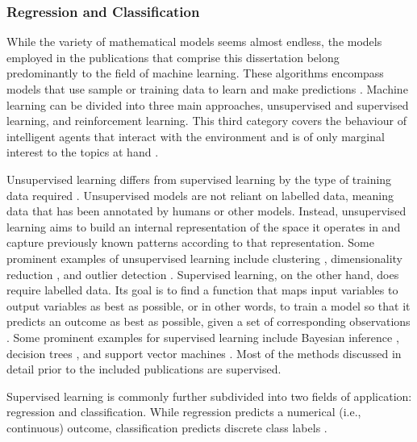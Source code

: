 \subsubsection{Regression and Classification}\label{subsubsec:regclas}
While the variety of mathematical models seems almost endless, the models
employed in the publications that comprise this dissertation belong
predominantly to the field of machine learning. These algorithms encompass
models that use sample or training data to learn and make predictions \citep{%
Mitchell}. Machine learning can be divided into three main approaches,
unsupervised and supervised learning, and reinforcement learning. This third
category covers the behaviour of intelligent agents that interact with the
environment and is of only marginal interest to the topics at hand \citep{%
Joshi2021a}.

Unsupervised \label{%
mar:supunsup} learning differs from supervised learning by the type of
training data required \citep{Hinton1999}. Unsupervised  models are not
reliant on labelled data, meaning data that has been annotated by humans or
other models. Instead, unsupervised learning aims to build an internal
representation of the space it operates in and capture previously known
patterns according to that representation. Some prominent examples of
unsupervised learning include clustering \citep{Rokach2005}, dimensionality
reduction \citep{VanDerMaaten2009}, and outlier detection \citep{Hawkins1980}.
Supervised learning, on the other hand, does require labelled data. Its goal
is to find a function that maps input variables to output variables as best as
possible, or in other words, to train a model so that it predicts an outcome
as best as possible, given a set of corresponding observations \citep{%
Mohri2018}. Some prominent examples for supervised learning include Bayesian 
inference \citep{Gelman2014}, decision trees \citep{Kaminski2018}, and support 
vector machines \citep{Cortes1995}. Most of the methods discussed in detail
prior to the included publications are supervised.

Supervised learning is commonly further subdivided into two fields of
application: regression and classification. While regression predicts a
numerical (i.e., continuous) outcome, classification predicts discrete class
labels \citep{James2009}.



